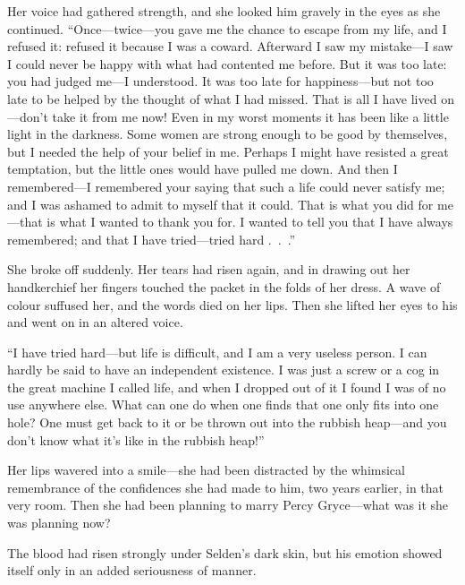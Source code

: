 \documentclass[12pt,a4paper]{book}
\begin{document}
Her voice had gathered strength, and she looked him gravely in
the eyes as she continued. ``Once---twice---you gave me the chance
to escape from my life, and I refused it: refused it because I
was a coward. Afterward I saw my mistake---I saw I could never be
happy with what had contented me before. But it was too late: you
had judged me---I understood. It was too late for happiness---but
not too late to be helped by the thought of what I had missed. 
That is all I have lived on---don't take it from me now! Even in
my worst moments it has been like a little light in the darkness. 
Some women are strong enough to be good by themselves, but I
needed the help of your belief in me. Perhaps I might have
resisted a great temptation, but the little ones would have
pulled me down. And then I remembered---I remembered your saying
that such a life could never satisfy me; and I was ashamed to
admit to myself that it could. That is what you did for me---that
is what I wanted to thank you for. I wanted to tell you that I
have always remembered; and that I have tried---tried hard .\ .\ .''





She broke off suddenly. Her tears had risen again, and in drawing
out her handkerchief her fingers touched the packet in the folds
of her dress. A wave of colour suffused her, and the words died
on her lips. Then she lifted her eyes to his and went on in an
altered voice.





``I have tried hard---but life is difficult, and I am a very
useless person. I can hardly be said to have an independent
existence. I was just a screw or a cog in the great machine
I called life, and when I dropped out of it I found I was
of no use anywhere else. What can one do when one finds that one
only fits into one hole? One must get back to it or be thrown out
into the rubbish heap---and you don't know what it's like in the
rubbish heap!''





Her lips wavered into a smile---she had been distracted by the
whimsical remembrance of the confidences she had made to him, two
years earlier, in that very room. Then she had been planning to
marry Percy Gryce---what was it she was planning now?





The blood had risen strongly under Selden's dark skin, but his
emotion showed itself only in an added seriousness of manner.
\end{document}

